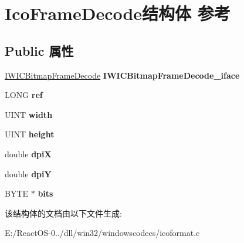 \hypertarget{struct_ico_frame_decode}{}\section{Ico\+Frame\+Decode结构体 参考}
\label{struct_ico_frame_decode}
\subsection*{Public 属性}
\begin{DoxyCompactItemize}
\item 
\mbox{\label{struct_ico_frame_decode_aaee2e0151ea6d1b8f268709190422bab}} 
\hyperlink{interface_i_w_i_c_bitmap_frame_decode}{I\+W\+I\+C\+Bitmap\+Frame\+Decode} {\bfseries I\+W\+I\+C\+Bitmap\+Frame\+Decode\+\_\+iface}
\item 
\mbox{\label{struct_ico_frame_decode_accd43f00eafe782ae0f511ebce9e728d}} 
L\+O\+NG {\bfseries ref}
\item 
\mbox{\label{struct_ico_frame_decode_af972aae3db05f6d5c0a9cc7e873fbfff}} 
U\+I\+NT {\bfseries width}
\item 
\mbox{\label{struct_ico_frame_decode_a9070c3f7f15ff735aa7e1c42e77608f9}} 
U\+I\+NT {\bfseries height}
\item 
\mbox{\label{struct_ico_frame_decode_ad395c2f52807592cfd504f054d412f53}} 
double {\bfseries dpiX}
\item 
\mbox{\label{struct_ico_frame_decode_aa2f82d6e307650b7a6d399bc00692f4b}} 
double {\bfseries dpiY}
\item 
\mbox{\label{struct_ico_frame_decode_a0f4b7e6d72607fbf767f82b86660ff8f}} 
B\+Y\+TE $\ast$ {\bfseries bits}
\end{DoxyCompactItemize}


该结构体的文档由以下文件生成\+:\begin{DoxyCompactItemize}
\item 
E\+:/\+React\+O\+S-\/0../dll/win32/windowscodecs/icoformat.\+c\end{DoxyCompactItemize}
